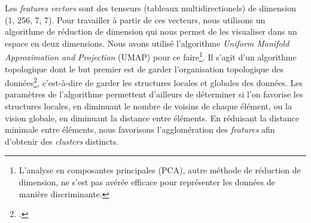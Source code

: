 Les \textit{features vectors} sont des tenseurs (tableaux multidirectionels) de dimension (1, 256, 7, 7).
Pour travailler à partir de ces vecteurs, nous utilisons un algorithme de réduction de dimension qui nous permet de les visualiser dans un espace en deux dimensions. Nous avons utilisé l'algorithme \textit{Uniform Manifold Approximation and Projection} (UMAP) pour ce faire\footnote{L'analyse en composantes principales (PCA), autre méthode de réduction de dimension, ne s'est pas avérée efficace pour représenter les données de manière discriminante.}. Il s'agit d'un algorithme topologique dont le but premier est de garder l'organisation topologique des données\footcite[p.~13]{mcinnesUMAPUniformManifold2018}, c'est-à-dire de garder les structures locales et globales des données. Les paramètres de l'algorithme permettent d'ailleurs de déterminer si l'on favorise les structures locales, en diminuant le nombre de voisins de chaque élément, ou la vision globale, en diminuant la distance entre éléments. En réduisant la distance minimale entre éléments, nous favorisons l'agglomération des \textit{features} afin d'obtenir des \textit{clusters} distincts.

